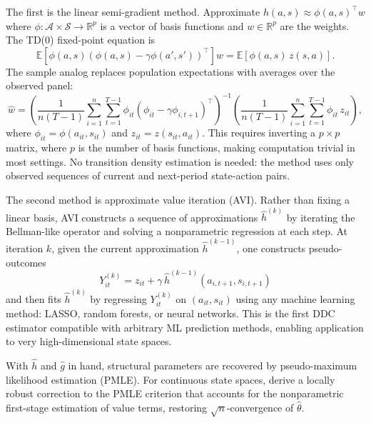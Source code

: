 The first is the linear semi-gradient method. Approximate $h(a,s) \approx \phi(a,s)^\top w$ where $\phi: \mathcal{A} \times \mathcal{S} \to \mathbb{R}^p$ is a vector of basis functions and $w \in \mathbb{R}^p$ are the weights. The TD(0) fixed-point equation is
\begin{equation}
\mathbb{E}\left[\phi(a,s)\left(\phi(a,s) - \gamma \phi(a', s')\right)^\top\right] w = \mathbb{E}\left[\phi(a,s) \, z(s,a)\right]. \label{eq:ae_semigradient}
\end{equation}
The sample analog replaces population expectations with averages over the observed panel:
\begin{equation}
\hat{w} = \left(\frac{1}{n(T-1)} \sum_{i=1}^n \sum_{t=1}^{T-1} \phi_{it}\left(\phi_{it} - \gamma \phi_{i,t+1}\right)^\top\right)^{-1} \left(\frac{1}{n(T-1)} \sum_{i=1}^n \sum_{t=1}^{T-1} \phi_{it} \, z_{it}\right),
\end{equation}
where $\phi_{it} = \phi(a_{it}, s_{it})$ and $z_{it} = z(s_{it}, a_{it})$. This requires inverting a $p \times p$ matrix, where $p$ is the number of basis functions, making computation trivial in most settings. No transition density estimation is needed: the method uses only observed sequences of current and next-period state-action pairs.

The second method is approximate value iteration (AVI). Rather than fixing a linear basis, AVI constructs a sequence of approximations $\hat{h}^{(k)}$ by iterating the Bellman-like operator and solving a nonparametric regression at each step. At iteration $k$, given the current approximation $\hat{h}^{(k-1)}$, one constructs pseudo-outcomes
\begin{equation}
Y_{it}^{(k)} = z_{it} + \gamma \, \hat{h}^{(k-1)}(a_{i,t+1}, s_{i,t+1})
\end{equation}
and then fits $\hat{h}^{(k)}$ by regressing $Y_{it}^{(k)}$ on $(a_{it}, s_{it})$ using any machine learning method: LASSO, random forests, or neural networks. This is the first DDC estimator compatible with arbitrary ML prediction methods, enabling application to very high-dimensional state spaces.

With $\hat{h}$ and $\hat{g}$ in hand, structural parameters are recovered by pseudo-maximum likelihood estimation (PMLE). For continuous state spaces, \citet{AdusumilliEckardt2022} derive a locally robust correction to the PMLE criterion that accounts for the nonparametric first-stage estimation of value terms, restoring $\sqrt{n}$-convergence of $\hat{\theta}$.

